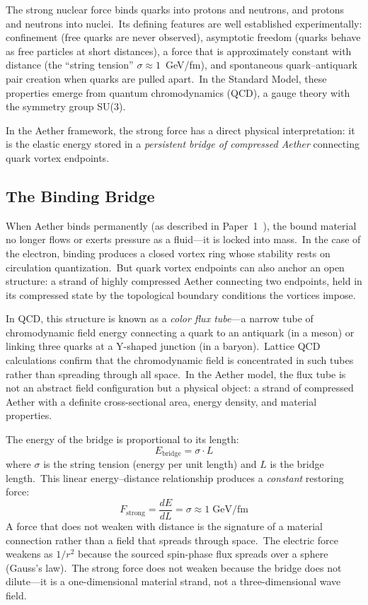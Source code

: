 ﻿\documentclass[12pt,letterpaper]{article}
\begin{document}
The strong nuclear force binds quarks into protons and neutrons, and protons and neutrons
into nuclei.\ Its defining features are well established experimentally: confinement (free
quarks are never observed), asymptotic freedom (quarks behave as free particles at short
distances), a force that is approximately constant with distance (the ``string tension''
$\sigma \approx 1$~GeV/fm), and spontaneous quark--antiquark pair creation when quarks
are pulled apart.\ In the Standard Model, these properties emerge from quantum
chromodynamics (QCD), a gauge theory with the symmetry group SU(3).

In the Aether framework, the strong force has a direct physical interpretation: it is the
elastic energy stored in a \emph{persistent bridge of compressed Aether} connecting quark
vortex endpoints.


\subsection{The Binding Bridge}

When Aether binds permanently (as described in Paper~1~\cite{otto-overview}), the bound material no longer
flows or exerts pressure as a fluid---it is locked into mass.\ In the case of the electron,
binding produces a closed vortex ring whose stability rests on circulation quantization.\
But quark vortex endpoints can also anchor an open structure: a strand of highly compressed
Aether connecting two endpoints, held in its compressed state by the topological boundary
conditions the vortices impose.

In QCD, this structure is known as a \emph{color flux tube}---a narrow tube of
chromodynamic field energy connecting a quark to an antiquark (in a meson) or linking
three quarks at a Y-shaped junction (in a baryon).\ Lattice QCD calculations confirm
that the chromodynamic field is concentrated in such tubes rather than spreading
through all space.\ In the Aether model, the flux tube is not an abstract field
configuration but a physical object: a strand of compressed Aether with a definite
cross-sectional area, energy density, and material properties.

The energy of the bridge is proportional to its length:
%
\begin{equation}
  E_{\mathrm{bridge}} = \sigma \cdot L
  \label{eq:string-tension}
\end{equation}
%
where $\sigma$ is the string tension (energy per unit length) and $L$ is the bridge
length.\ This linear energy--distance relationship produces a \emph{constant} restoring
force:
%
\begin{equation}
  F_{\mathrm{strong}} = \frac{dE}{dL} = \sigma \approx 1\;\mathrm{GeV/fm}
\end{equation}
%
A force that does not weaken with distance is the signature of a material connection
rather than a field that spreads through space.\ The electric force weakens as $1/r^2$
because the sourced spin-phase flux spreads over a sphere (Gauss's law).\ The
strong force does not weaken because the bridge does not dilute---it is a one-dimensional
material strand, not a three-dimensional wave field.
\end{document}
